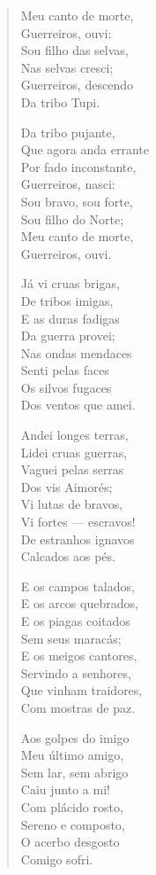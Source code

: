 \begin{verse}
Meu canto de morte, \\
Guerreiros, ouvi: \\
Sou filho das selvas, \\
Nas selvas cresci; \\
Guerreiros, descendo \\
Da tribo Tupi.
						
Da tribo pujante, \\
Que agora anda errante \\
Por fado inconstante, \\
Guerreiros, nasci: \\
Sou bravo, sou forte, \\
Sou filho do Norte; \\
Meu canto de morte, \\
Guerreiros, ouvi.
						
Já vi cruas brigas, \\
De tribos imigas, \\
E as duras fadigas \\
Da guerra provei; \\
Nas ondas mendaces \\
Senti pelas faces \\
Os silvos fugaces \\
Dos ventos que amei.
						
Andei longes terras, \\
Lidei cruas guerras, \\
Vaguei pelas serras \\
Dos vis Aimorés; \\
Vi lutas de bravos, \\
Vi fortes — escravos! \\
De estranhos ignavos \\
Calcados aos pés.
						
E os campos talados, \\
E os arcos quebrados, \\
E os piagas coitados \\
Sem seus maracás; \\
E os meigos cantores, \\
Servindo a senhores, \\
Que vinham traidores, \\
Com mostras de paz.
						
Aos golpes do imigo \\
Meu último amigo, \\
Sem lar, sem abrigo \\
Caiu junto a mi! \\
Com plácido rosto, \\
Sereno e composto, \\
O acerbo desgosto \\
Comigo sofri.
						

\end{verse}

